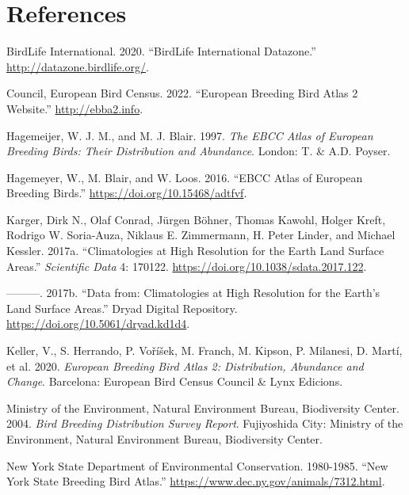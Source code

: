 \documentclass[
  letterpaper,
  DIV=11,
  numbers=noendperiod]{scrreprt}
\newlength{\cslhangindent}
\newenvironment{CSLReferences}[2] %
 {\begin{list}{}{%
  \setlength{\itemindent}{0pt}
  \setlength{\leftmargin}{0pt}
  \setlength{\parsep}{0pt}
  \ifodd #1
   \setlength{\leftmargin}{\cslhangindent}
   \setlength{\itemindent}{-1\cslhangindent}
  \fi
  \setlength{\itemsep}{#2\baselineskip}}}
 {\end{list}}
\begin{document}
\chapter*{References}\label{references}


\label{refs}
\begin{CSLReferences}{1}{0}
BirdLife International. 2020. {``BirdLife International Datazone.''}
\url{http://datazone.birdlife.org/}.

Council, European Bird Census. 2022. {``European Breeding Bird Atlas 2
Website.''} \url{http://ebba2.info}.

Hagemeijer, W. J. M., and M. J. Blair. 1997. \emph{The EBCC Atlas of
European Breeding Birds: Their Distribution and Abundance}. London: T.
\& A.D. Poyser.

Hagemeyer, W., M. Blair, and W. Loos. 2016. {``EBCC Atlas of European
Breeding Birds.''} \url{https://doi.org/10.15468/adtfvf}.

Karger, Dirk N., Olaf Conrad, Jürgen Böhner, Thomas Kawohl, Holger
Kreft, Rodrigo W. Soria-Auza, Niklaus E. Zimmermann, H. Peter Linder,
and Michael Kessler. 2017a. {``Climatologies at High Resolution for the
Earth Land Surface Areas.''} \emph{Scientific Data} 4: 170122.
\url{https://doi.org/10.1038/sdata.2017.122}.

---------. 2017b. {``Data from: Climatologies at High Resolution for the
Earth's Land Surface Areas.''} Dryad Digital Repository.
\url{https://doi.org/10.5061/dryad.kd1d4}.

Keller, V., S. Herrando, P. Voříšek, M. Franch, M. Kipson, P. Milanesi,
D. Martí, et al. 2020. \emph{European Breeding Bird Atlas 2:
Distribution, Abundance and Change}. Barcelona: European Bird Census
Council \& Lynx Edicions.

Ministry of the Environment, Natural Environment Bureau, Biodiversity
Center. 2004. \emph{Bird Breeding Distribution Survey Report}.
Fujiyoshida City: Ministry of the Environment, Natural Environment
Bureau, Biodiversity Center.

New York State Department of Environmental Conservation. 1980-1985.
{``New York State Breeding Bird Atlas.''}
\url{https://www.dec.ny.gov/animals/7312.html}.


\end{CSLReferences}
\end{document}
